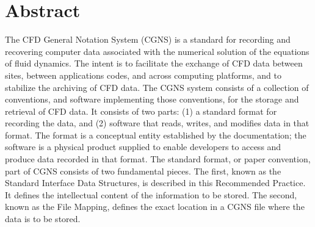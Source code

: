 \hypertarget{abstract}{}
\section*{Abstract}
\thispagestyle{plain}

The CFD General Notation System (CGNS) is a standard for recording and recovering computer
data associated with the numerical solution of the equations of fluid dynamics. The intent is to
facilitate the exchange of CFD data between sites, between applications codes, and across
computing platforms, and to stabilize the archiving of CFD data.
The CGNS system consists of a collection of conventions, and software implementing those
conventions, for the storage and retrieval of CFD data. It consists of two parts: (1) a standard
format for recording the data, and (2) software that reads, writes, and modifies data in that format.
The format is a conceptual entity established by the documentation; the software is a physical
product supplied to enable developers to access and produce data recorded in that format.
The standard format, or paper convention, part of CGNS consists of two fundamental pieces. The
first, known as the Standard Interface Data Structures, is described in this Recommended
Practice. It defines the intellectual content of the information to be stored. The second, known as
the File Mapping, defines the exact location in a CGNS file where the data is to be stored.
